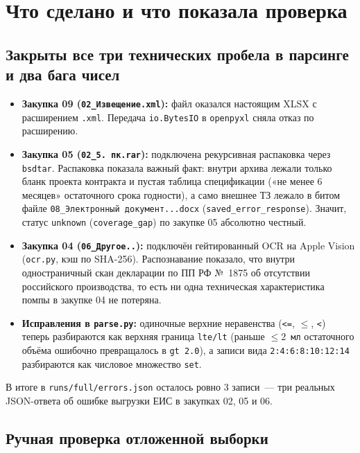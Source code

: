 \documentclass[11pt,a4paper]{article}
\begin{document}
\section{Что сделано и что показала проверка}

\subsection{Закрыты все три технических пробела в парсинге и два бага чисел}

\begin{itemize}
  \item \textbf{Закупка 09 (\texttt{02\_Извещение.xml}):} файл оказался настоящим XLSX с расширением \texttt{.xml}. Передача \texttt{io.BytesIO} в \texttt{openpyxl} сняла отказ по расширению.
  \item \textbf{Закупка 05 (\texttt{02\_5.\ пк.rar}):} подключена рекурсивная распаковка через \texttt{bsdtar}. Распаковка показала важный факт: внутри архива лежали только бланк проекта контракта и пустая таблица спецификации («не менее 6 месяцев» остаточного срока годности), а само внешнее ТЗ лежало в битом файле \texttt{08\_Электронный документ...docx} (\texttt{saved\_error\_response}). Значит, статус \texttt{unknown} (\texttt{coverage\_gap}) по закупке 05 абсолютно честный.
  \item \textbf{Закупка 04 (\texttt{06\_Другое..}):} подключён гейтированный OCR на Apple Vision (\texttt{ocr.py}, кэш по SHA-256). Распознавание показало, что внутри одностраничный скан декларации по ПП РФ №~1875 об отсутствии российского производства, то есть ни одна техническая характеристика помпы в закупке 04 не потеряна.
  \item \textbf{Исправления в \texttt{parse.py}:} одиночные верхние неравенства (\texttt{<=}, $\le$, \texttt{<}) теперь разбираются как верхняя граница \texttt{lte/lt} (раньше \texttt{$\le 2$ мл} остаточного объёма ошибочно превращалось в \texttt{gt 2.0}), а записи вида \texttt{2:4:6:8:10:12:14} разбираются как числовое множество \texttt{set}.
\end{itemize}

В итоге в \texttt{runs/full/errors.json} осталось ровно 3 записи~--- три реальных JSON-ответа об ошибке выгрузки ЕИС в закупках 02, 05 и 06.

\subsection{Ручная проверка отложенной выборки}
\end{document}
